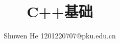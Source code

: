 \documentclass[12pt,twiside,a4paper]{ctexbook}
\numberwithin{chapter}{part}
\begin{document}

\author
{
Shuwen He
1201220707@pku.edu.cn
}


\title{C++基础}
\maketitle
\tableofcontents %
\newpage
\pagestyle{fancy}
\end{document}
